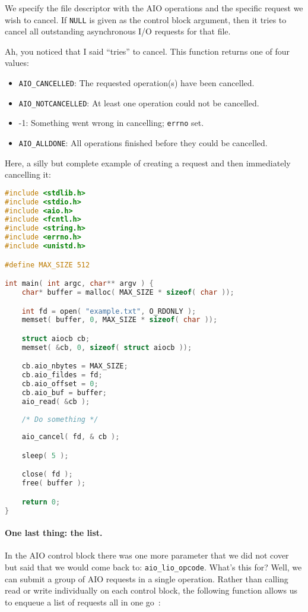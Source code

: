 We specify the file descriptor with the AIO operations and the specific request we wish to cancel. If \texttt{NULL} is given as the control block argument, then it tries to cancel all outstanding asynchronous I/O requests for that file.

Ah, you noticed that I said ``tries'' to cancel. This function returns one of four values:
\begin{itemize}
	\item \texttt{AIO\_CANCELLED}: The requested operation(s) have been cancelled.
	\item \texttt{AIO\_NOTCANCELLED}: At least one operation could not be cancelled.
	\item -1: Something went wrong in cancelling; \texttt{errno} set.
	\item \texttt{AIO\_ALLDONE}: All operations finished before they could be cancelled.
\end{itemize}

Here, a silly but complete example of creating a request and then immediately cancelling it:

\begin{lstlisting}[language=C]
#include <stdlib.h>
#include <stdio.h>
#include <aio.h>
#include <fcntl.h>
#include <string.h>
#include <errno.h>
#include <unistd.h>

#define MAX_SIZE 512

int main( int argc, char** argv ) {
    char* buffer = malloc( MAX_SIZE * sizeof( char ));

    int fd = open( "example.txt", O_RDONLY );
    memset( buffer, 0, MAX_SIZE * sizeof( char ));

    struct aiocb cb;
    memset( &cb, 0, sizeof( struct aiocb ));

    cb.aio_nbytes = MAX_SIZE;
    cb.aio_fildes = fd;
    cb.aio_offset = 0;
    cb.aio_buf = buffer;
    aio_read( &cb );
    
    /* Do something */
    
    aio_cancel( fd, & cb );

    sleep( 5 );

    close( fd );
    free( buffer );

    return 0;
}
\end{lstlisting}

\paragraph{One last thing: the list.}
In the AIO control block there was one more parameter that we did not cover but said that we would come back to: \texttt{aio\_lio\_opcode}. What's this for? Well, we can submit a group of AIO requests in a single operation. Rather than calling read or write individually on each control block, the following function allows us to enqueue a list of requests all in one go~\cite{apunix}:

